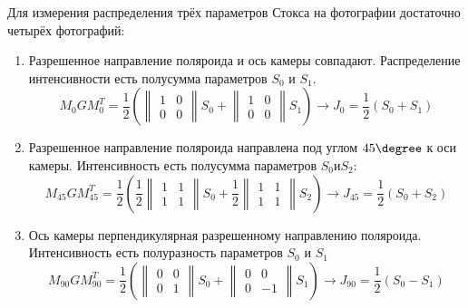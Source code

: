 \documentclass[a4paper]{article}
\begin{document}
Для измерения распределения трёх параметров Стокса на фотографии достаточно четырёх фотографий: 
\begin{enumerate}
    \item Разрешенное направление поляроида и ось камеры совпадают. Распределение интенсивности есть полусумма параметров $S_{0}$ и $S_{1}$.
        \begin{equation}
    M_{0} G M_{0}^{T} =
    \frac{1}{2}
    \left(
    \begin{Vmatrix}
        1 & 0 \\
        0 & 0
    \end{Vmatrix} S_{0} + 
      \begin{Vmatrix}
        1 & 0 \\
        0 & 0
    \end{Vmatrix} S_{1}
    \right)
    \to 
    J_{0} = \frac{1}{2} (S_{0} + S_{1})
    \label{0_polaroid_on_G}
\end{equation}
\item Разрешенное направление поляроида направлена под углом $45 \degree$ к оси камеры. Интенсивность есть полусумма параметров $S_{0} и S_{2}$:
\begin{equation}
    M_{45} G M_{45}^{T} =
    \frac{1}{2}
    \left(
    \frac{1}{2}
    \begin{Vmatrix}
        1 & 1 \\
        1 & 1
    \end{Vmatrix} S_{0} + 
    \frac{1}{2}
      \begin{Vmatrix}
        1 & 1 \\
        1 & 1
    \end{Vmatrix} S_{2} 
    \right)
    \to 
    J_{45} = \frac{1}{2} (S_{0} + S_{2})
    \label{45_polaroid_on_G}
\end{equation}
\item Ось камеры перпендикулярная разрешенному направлению поляроида. Интенсивность есть полуразность параметров $S_{0}$ и $S_{1}$
\begin{equation}
    M_{90} G M_{90}^{T} =
    \frac{1}{2} \left(
    \begin{Vmatrix}
        0 & 0 \\
        0 & 1
    \end{Vmatrix} S_{0} + 
      \begin{Vmatrix}
        0 & 0 \\
        0 & -1
    \end{Vmatrix} S_{1} 
    \right)
    \to 
    J_{90} = \frac{1}{2}(S_{0} - S_{1})
    \label{90_polaroid_on_G}
\end{equation}


\end{enumerate}
\end{document}
